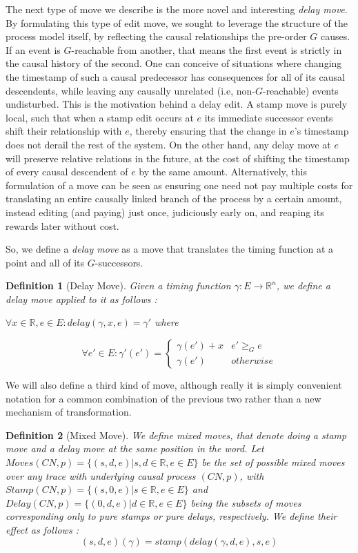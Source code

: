 \documentclass{article}
\newcounter{cases}
\theoremstyle{Definition}
\newtheorem{definition}{Definition}
\theoremstyle{definition}
\begin{document}
	The next type of move we describe is the more novel and interesting \textit{delay move}. 
	By formulating this type of edit move, we sought to leverage the structure of the process model itself, by reflecting the causal relationships the pre-order $G$ causes. 
	If an event is $G$-reachable from another, that means the first event is strictly in the causal history of the second. 
	One can conceive of situations where changing the timestamp of such a causal predecessor has consequences for all of its causal descendents, while leaving any causally unrelated (i.e, non-$G$-reachable) events undisturbed. 
	This is the motivation behind a delay edit. 
	A stamp move is purely local, such that when a stamp edit occurs at $e$ its immediate successor events shift their relationship with $e$, thereby ensuring that the change in $e$'s timestamp does not derail the rest of the system. 
	On the other hand, any delay move at $e$ will preserve relative relations in the future, at the cost of shifting the timestamp of every causal descendent of $e$ by the same amount. 
	Alternatively, this formulation of a move can be seen as ensuring one need not pay multiple costs for translating an entire causally linked branch of the process by a certain amount, instead editing (and paying) just once, judiciously early on, and reaping its rewards later without cost. 
	
	So, we define a \textit{delay move} as a move that translates the timing function at a point and all of its $G$-successors. 
	
	\begin{definition}[Delay Move]
			Given a timing function $\gamma : E \to \mathbb{R}^n$, we define a delay move applied to it as follows : 
		
		$\forall x \in \mathbb{R}, e \in E : delay(\gamma, x, e) = \gamma'$ where 
		
		$$\forall e' \in E : \gamma'(e') = \begin{cases}
			\gamma(e') + x & e' \geq_G e \\
			\gamma(e')& otherwise
		\end{cases}$$
		
	\end{definition}
	
	We will also define a third kind of move, although really it is simply convenient notation for a common combination of the previous two rather than a new mechanism of transformation. 
	
	\begin{definition}[Mixed Move]
		We define \textit{mixed moves}, that denote doing a stamp move and a delay move at the same position in the word. Let $Moves(CN, p) = \{(s, d, e) | s, d \in \mathbb{R}, e \in E\}$ be the set of possible mixed moves over any trace with underlying causal process $(CN, p)$, with $Stamp(CN, p) = \{(s, 0, e) | s \in \mathbb{R}, e \in E\}$ and $Delay(CN, p) = \{(0, d, e) | d \in \mathbb{R}, e \in E\}$ being the subsets of moves corresponding only to pure stamps or pure delays, respectively. 
		We define their effect as follows : $$(s, d, e)(\gamma) = stamp(delay(\gamma, d, e), s, e)$$
	\end{definition}
	
\end{document}
